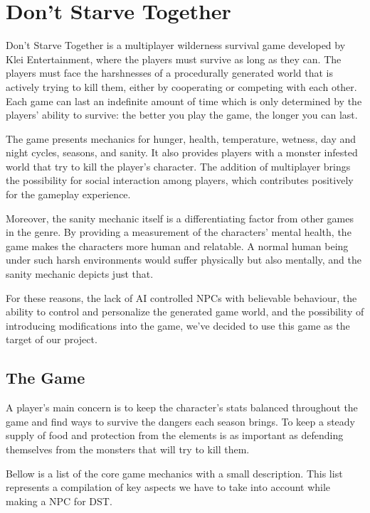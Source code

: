 \section{Don't Starve Together}

Don't Starve Together is a multiplayer wilderness survival game developed by Klei Entertainment, where the players must survive as long as they can.
The players must face the harshnesses of a procedurally generated world that is actively trying to kill them, either by cooperating or competing with each other.
Each game can last an indefinite amount of time which is only determined by the players' ability to survive: the better you play the game, the longer you can last.

The game presents mechanics for hunger, health, temperature, wetness, day and night cycles, seasons, and sanity.
It also provides players with a monster infested world that try to kill the player's character.
The addition of multiplayer brings the possibility for social interaction among players, which contributes positively for the gameplay experience.

Moreover, the sanity mechanic itself is a differentiating factor from other games in the genre.
By providing a measurement of the characters' mental health, the game makes the characters more human and relatable.
A normal human being under such harsh environments would suffer physically but also mentally, and the sanity mechanic depicts just that.

For these reasons, the lack of AI controlled NPCs with believable behaviour, the ability to control and personalize the generated game world, and the possibility of introducing modifications into the game, we've decided to use this game as the target of our project.

\subsection{The Game}

A player's main concern is to keep the character's stats balanced throughout the game and find ways to survive the dangers each season brings.
To keep a steady supply of food and protection from the elements is as important as defending themselves from the monsters that will try to kill them.

Bellow is a list of the core game mechanics with a small description.
This list represents a compilation of key aspects we have to take into account while making a NPC for DST.

